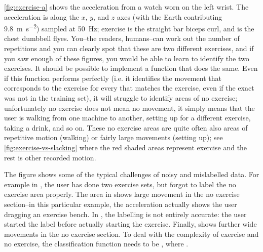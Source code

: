 \autoref{fig:exercise-a} shows the acceleration from a watch worn on the left wrist. The acceleration is along the $x$, $y$, and $z$ axes (with the Earth contributing \SI{9.8}{\meter\second^{-2}}) sampled at \SI{50}{\hertz}; exercise  is the straight bar biceps curl, and  is the chest dumbbell flyes. You--the readers, humans--can work out the number of repetitions and you can clearly spot that these are two different exercises, and if you saw enough of these figures, you would be able to learn to identify the two exercises. It should be possible to implement a function  that does the same. Even if this function performs perfectly (i.e. it identifies the movement that corresponds to the exercise for every  that matches the exercise, even if the exact  was not in the training set), it will struggle to identify areas of no exercise; unfortunately no exercise does not mean no movement, it simply means that the user is walking from one machine to another, setting up for a different exercise, taking a drink, and so on. These no exercise areas are quite often also areas of repetitive motion (walking) or fairly large movements (setting up); see \autoref{fig:exercise-vs-slacking} where the red shaded areas represent exercise and the rest is other recorded motion.


The figure shows some of the typical challenges of noisy and mislabelled data. For example in , the user has done two exercise sets, but forgot to label the no exercise area properly. The area in  shows large movement in the no exercise section--in this particular example, the acceleration actually shows the user dragging an exercise bench. In , the labelling is not entirely accurate: the user started the label before actually starting the exercise. Finally,  shows further wide movements in the no exercise section. To deal with the complexity of exercise and no exercise, the classification function needs to be , where . 

